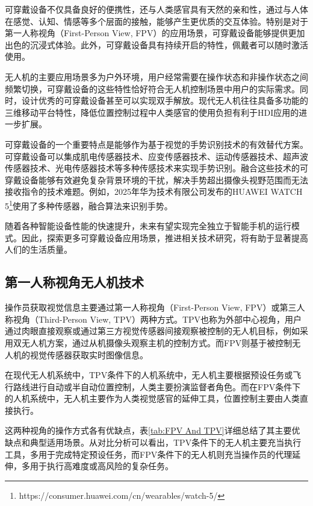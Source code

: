 可穿戴设备不仅具备良好的便携性，还与人类感官具有天然的亲和性，通过与人体在感觉、认知、情感等多个层面的接触，能够产生更优质的交互体验。特别是对于第一人称视角（First-Person View, FPV）的应用场景，可穿戴设备能够提供更加出色的沉浸式体验。此外，可穿戴设备具有持续开启的特性，佩戴者可以随时激活使用\cite{motti2020wearable}。

无人机的主要应用场景多为户外环境，用户经常需要在操作状态和非操作状态之间频繁切换，可穿戴设备的这些特性恰好符合无人机控制场景中用户的实际需求。同时，设计优秀的可穿戴设备甚至可以实现双手解放。现代无人机往往具备多功能的三维移动平台特性，降低位置控制过程中人类感官的使用负担有利于HDI应用的进一步扩展。

可穿戴设备的一个重要特点是能够作为基于视觉的手势识别技术的有效替代方案。可穿戴设备可以集成肌电传感器技术、应变传感器技术、运动传感器技术、超声波传感器技术、光电传感器技术等多种传感技术来实现手势识别。融合这些技术的可穿戴设备能够有效避免复杂背景环境的干扰，解决手势超出摄像头视野范围而无法接收指令的技术难题。例如，2025年华为技术有限公司发布的HUAWEI WATCH 5\footnote{https://consumer.huawei.com/cn/wearables/watch-5/}使用了多种传感器，融合算法来识别手势。

随着各种智能设备性能的快速提升，未来有望实现完全独立于智能手机的运行模式。因此，探索更多可穿戴设备应用场景，推进相关技术研究，将有助于显著提高人们的生活质量。

\subsection{第一人称视角无人机技术}

操作员获取视觉信息主要通过第一人称视角（First-Person View, FPV）或第三人称视角（Third-Person View, TPV）两种方式。TPV也称为外部中心视角，用户通过肉眼直接观察或通过第三方视觉传感器间接观察被控制的无人机目标，例如采用双无人机方案，通过从机摄像头观察主机的控制方式\cite{inoue2023birdviewar}。而FPV则基于被控制无人机的视觉传感器获取实时图像信息。

在现代无人机系统中，TPV条件下的人机系统中，无人机主要根据预设任务或飞行路线进行自动或半自动位置控制，人类主要扮演监督者角色。而在FPV条件下的人机系统中，无人机主要作为人类视觉感官的延伸工具，位置控制主要由人类直接执行。

这两种视角的操作方式各有优缺点，表\ref{tab:FPV And TPV}详细总结了其主要优缺点和典型适用场景。从对比分析可以看出，TPV条件下的无人机主要充当执行工具，多用于完成特定预设任务，而FPV条件下的无人机则充当操作员的代理延伸，多用于执行高难度或高风险的复杂任务。

